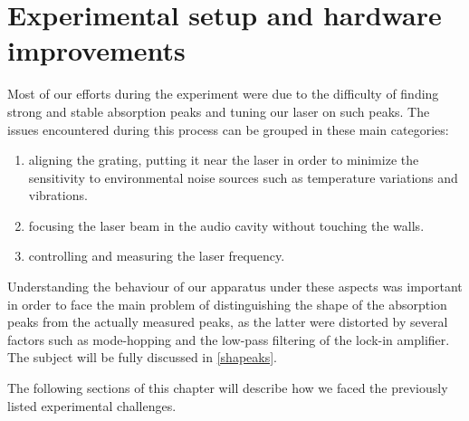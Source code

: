 \chapter{Experimental setup and hardware improvements} 
Most of our efforts during the experiment were due to the difficulty of finding strong and stable absorption peaks and tuning our laser on such peaks.
The issues encountered during this process can be grouped in these main categories:
\begin{enumerate} 
\item aligning the grating, putting it near the laser in order to minimize the sensitivity to environmental noise sources such as temperature variations and vibrations.
\item focusing the laser beam in the audio cavity without touching the walls.
\item controlling and measuring the laser frequency.
\end{enumerate}
Understanding the behaviour of our apparatus under these aspects was important in order to face the main problem of distinguishing the shape of the absorption peaks from the actually measured peaks, as the latter were distorted by several factors such as mode-hopping and the low-pass filtering of the lock-in amplifier. The subject will be fully discussed in \cref{shapeaks}.

\medskip
The following sections of this chapter will describe how we faced the previously listed experimental challenges.

